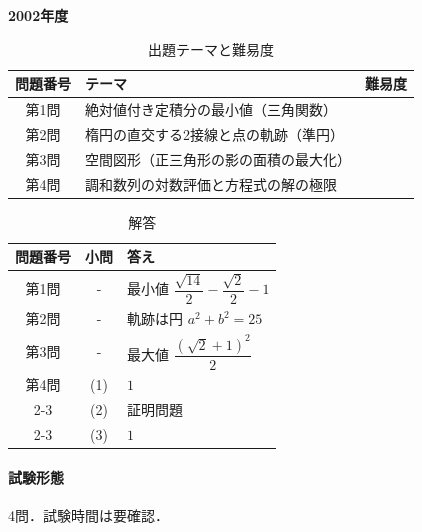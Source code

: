 \documentclass[../../main.tex]{subfiles}
\begin{document}
\begin{center}
  {\fontsize{48pt}{58pt}\selectfont \textbf{2002}\normalsize\textbf{年度}}
\end{center}

\begin{table}[htb]
  \centering
  \caption{出題テーマと難易度}
  \begin{tabular}{|c|p{9cm}|c|}
    \hline
    \textbf{問題番号} & \textbf{テーマ} & \textbf{難易度} \\
    \hline
    第1問 & 絶対値付き定積分の最小値（三角関数） & \\
    \hline
    第2問 & 楕円の直交する2接線と点の軌跡（準円） & \\
    \hline
    第3問 & 空間図形（正三角形の影の面積の最大化） & \\
    \hline
    第4問 & 調和数列の対数評価と方程式の解の極限 & \\
    \hline
  \end{tabular}
\end{table}

\begin{table}[htb]
  \centering
  \caption{解答}
  \renewcommand{\arraystretch}{1.4}
  \begin{tabular}{|c|c|p{9cm}|}
    \hline
    \textbf{問題番号} & \textbf{小問} & \textbf{答え} \\
    \hline
    第1問 & - & 最小値 $\dfrac{\sqrt{14}}{2}-\dfrac{\sqrt{2}}{2}-1$ \\
    \hline
    第2問 & - & 軌跡は円 $a^2+b^2=25$ \\
    \hline
    第3問 & - & 最大値 $\dfrac{(\sqrt{2}+1)^2}{2}$ \\
    \hline
    第4問 & (1) & $1$ \\
    \cline{2-3}
    & (2) & 証明問題 \\
    \cline{2-3}
    & (3) & $1$ \\
    \hline
  \end{tabular}
\end{table}

\paragraph{試験形態}
4問．試験時間は要確認．
\end{document}
